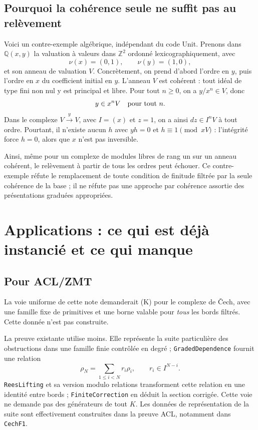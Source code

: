 \documentclass[11pt]{amsart}
\begin{document}
\subsection*{Pourquoi la cohérence seule ne suffit pas au relèvement}
Voici un contre-exemple algébrique, indépendant du code Unit.
Prenons dans $\mathbb Q(x,y)$ la valuation à valeurs dans
$\mathbb Z^2$ ordonné lexicographiquement, avec
\[
 \nu(x)=(0,1),\qquad \nu(y)=(1,0),
\]
et son anneau de valuation $V$. Concrètement, on prend d'abord l'ordre
en $y$, puis l'ordre en $x$ du coefficient initial en $y$.
L'anneau $V$ est cohérent : tout idéal de type fini non nul y est
principal et libre. Pour tout $n\geq0$, on a $y/x^n\in V$, donc
\[
 y\in x^nV\quad\hbox{pour tout }n.
\]
Dans le complexe $V\xrightarrow{\,y\,}V$, avec $I=(x)$ et $z=1$,
on a ainsi $dz\in I^nV$ à tout ordre. Pourtant, il n'existe aucun
$h$ avec $yh=0$ et $h\equiv1\pmod{xV}$ : l'intégrité force $h=0$,
alors que $x$ n'est pas inversible.

Ainsi, même pour un complexe de modules libres de rang un sur un
anneau cohérent, le relèvement à partir de tous les ordres peut échouer.
Ce contre-exemple réfute le remplacement de toute condition de finitude
filtrée par la seule cohérence de la base ; il ne réfute pas une approche
par cohérence assortie des présentations graduées appropriées.

\section{Applications : ce qui est déjà instancié et ce qui manque}

\subsection*{Pour ACL/ZMT}
La voie uniforme de cette note demanderait (K) pour le complexe de
\v Cech, avec une famille fixe de primitives et une borne valable pour
\emph{tous} les bords filtrés. Cette donnée n'est pas construite.

La preuve existante utilise moins. Elle représente la suite particulière
des obstructions dans une famille finie contrôlée en degré ;
\texttt{GradedDependence} fournit une relation
\[
 \rho_N=\sum_{1\leq i<N}r_i\rho_i,
 \qquad r_i\in I^{N-i}.
\]
\texttt{ReesLifting} et sa version modulo relations transforment cette
relation en une identité entre bords ; \texttt{FiniteCorrection}
en déduit la section corrigée. Cette voie ne demande pas des générateurs
de tout $K$. Les données de représentation de la suite sont effectivement
construites dans la preuve ACL, notamment dans \texttt{CechF1}.
\end{document}
